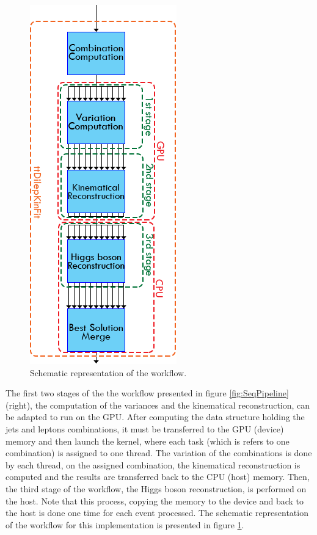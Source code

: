 \begin{figure}[!htp]
	\begin{center}
		\includegraphics[scale=0.5]{../../common/img/gpu_pipeline.png}
		\caption{Schematic representation of the \ttDilepKinFit workflow.}
		\label{fig:GPUPipeline}
	\end{center}
\end{figure}

The first two stages of the the workflow presented in figure \ref{fig:SeqPipeline} (right), the computation of the variances and the kinematical reconstruction, can be adapted to run on the GPU. After computing the data structure holding the jets and leptons combinations, it must be transferred to the GPU (device) memory and then launch the kernel, where each task (which is refers to one combination) is assigned to one thread. The variation of the combinations is done by each thread, on the assigned combination, the kinematical reconstruction is computed and the results are transferred back to the CPU (host) memory. Then, the third stage of the workflow, the Higgs boson reconstruction, is performed on the host. Note that this process, copying the memory to the device and back to the host is done one time for each event processed. The schematic representation of the workflow for this implementation is presented in figure \ref{fig:GPUPipeline}.


